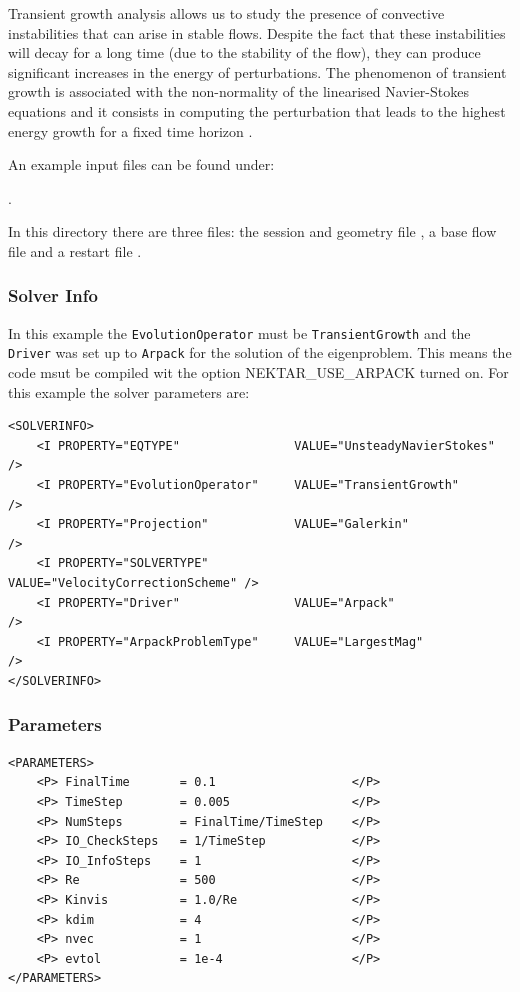 Transient growth analysis allows us to study the presence of
convective instabilities that can arise in stable flows. Despite the
fact that these instabilities will decay for a long time (due to the
stability of the flow), they can produce significant increases in the
energy of perturbations. The phenomenon of transient growth is
associated with the non-normality of the linearised Navier-Stokes
equations and it consists in computing the perturbation that leads to
the highest energy growth for a fixed time horizon \cite{BiGlobal}.

An example input files can be found under:

.

In this directory there are three files: the session and geometry file
, a base flow file
 and a restart file
.

\subsubsection*{Solver Info}

In this example the \texttt{EvolutionOperator} must be
\texttt{TransientGrowth} and the \texttt{Driver} was set up to
\texttt{Arpack} for the solution of the eigenproblem. This means the
code msut be compiled wit the option NEKTAR\_USE\_ARPACK turned
on. For this example the solver parameters are:

      \begin{lstlisting}[style=XMLStyle]
<SOLVERINFO>
    <I PROPERTY="EQTYPE"                VALUE="UnsteadyNavierStokes"     />
    <I PROPERTY="EvolutionOperator"     VALUE="TransientGrowth"          />
    <I PROPERTY="Projection"            VALUE="Galerkin"                 />
    <I PROPERTY="SOLVERTYPE"            VALUE="VelocityCorrectionScheme" />
    <I PROPERTY="Driver"                VALUE="Arpack"                   />
    <I PROPERTY="ArpackProblemType"     VALUE="LargestMag"               />
</SOLVERINFO>
  \end{lstlisting}


\subsubsection*{Parameters}

 \begin{lstlisting}[style=XMLStyle]
<PARAMETERS>
    <P> FinalTime       = 0.1                   </P>
    <P> TimeStep        = 0.005                 </P>
    <P> NumSteps        = FinalTime/TimeStep    </P>
    <P> IO_CheckSteps   = 1/TimeStep            </P>
    <P> IO_InfoSteps    = 1                     </P>
    <P> Re              = 500                   </P>
    <P> Kinvis          = 1.0/Re                </P>
    <P> kdim            = 4                     </P>
    <P> nvec            = 1                     </P>
    <P> evtol           = 1e-4                  </P>
</PARAMETERS>
   \end{lstlisting}


